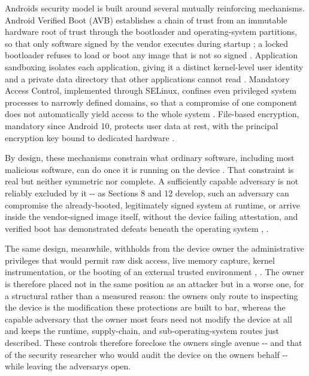 \documentclass[
]{article}
\begin{document}
Android\textquotesingle s security model is built around several
mutually reinforcing mechanisms. Android Verified Boot (AVB) establishes
a chain of trust from an immutable hardware root of trust through the
bootloader and operating-system partitions, so that only software signed
by the vendor executes during startup \citep{aosp-verified-boot}; a
locked bootloader refuses to load or boot any image that is not so
signed \citep{aosp-bootloader-locking}. Application sandboxing isolates
each application, giving it a distinct kernel-level user identity and a
private data directory that other applications cannot read
\citep{aosp-app-sandbox}. Mandatory Access Control, implemented through
SELinux, confines even privileged system processes to narrowly defined
domains, so that a compromise of one component does not automatically
yield access to the whole system \citep{aosp-selinux}. File-based
encryption, mandatory since Android 10, protects user data at rest, with
the principal encryption key bound to dedicated hardware
\citep{aosp-file-based-encryption}.

By design, these mechanisms constrain what ordinary software, including
most malicious software, can do once it is running on the device
\citep{mayrhofer-android-security-model}. That constraint is real but
neither symmetric nor complete. A sufficiently capable adversary is not
reliably excluded by it -\/- as Sections 8 and 12 develop, such an
adversary can compromise the already-booted, legitimately signed system
at runtime, or arrive inside the vendor-signed image itself, without the
device failing attestation, and verified boot has demonstrated defeats
beneath the operating system \citep{bootstomp},
\citep{shakevsky-trustzone}.

The same design, meanwhile, withholds from the device owner the
administrative privileges that would permit raw disk access, live memory
capture, kernel instrumentation, or the booting of an external trusted
environment \citep{aosp-adb-root}, \citep{vidas-android-collection}. The
owner is therefore placed not in the same position as an attacker but in
a worse one, for a structural rather than a measured reason: the
owner\textquotesingle s only route to inspecting the device is the
modification these protections are built to bar, whereas the capable
adversary that the owner most fears need not modify the device at all
and keeps the runtime, supply-chain, and sub-operating-system routes
just described. These controls therefore foreclose the
owner\textquotesingle s single avenue -\/- and that of the security
researcher who would audit the device on the owner\textquotesingle s
behalf -\/- while leaving the adversary\textquotesingle s open.
\end{document}
